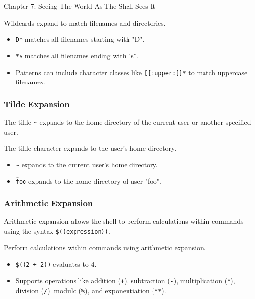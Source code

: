 \begin{notes}{Chapter 7: Seeing The World As The Shell Sees It}
\begin{highlight}
    Wildcards expand to match filenames and directories.
    
    \begin{itemize}
        \item \texttt{D*} matches all filenames starting with "D".
        \item \texttt{*s} matches all filenames ending with "s".
        \item Patterns can include character classes like \texttt{[[:upper:]]*} to match uppercase filenames.
    \end{itemize}
    
    \end{highlight}
    
    \subsubsection*{Tilde Expansion}
    
    The tilde \texttt{\~} expands to the home directory of the current user or another specified user.
    
    \begin{highlight}
    
    The tilde character expands to the user's home directory.
    
    \begin{itemize}
        \item \texttt{\~} expands to the current user's home directory.
        \item \texttt{\~foo} expands to the home directory of user "foo".
    \end{itemize}
    
    \end{highlight}
    
    \subsubsection*{Arithmetic Expansion}
    
    Arithmetic expansion allows the shell to perform calculations within commands using the syntax \texttt{\$((expression))}.
    
    \begin{highlight}
    
    Perform calculations within commands using arithmetic expansion.
    
    \begin{itemize}
        \item \texttt{\$((2 + 2))} evaluates to 4.
        \item Supports operations like addition (\texttt{+}), subtraction (\texttt{-}), multiplication (\texttt{*}), division (\texttt{/}), modulo (\texttt{\%}), and exponentiation (\texttt{**}).
    \end{itemize}
    

\end{highlight}
\end{notes}
